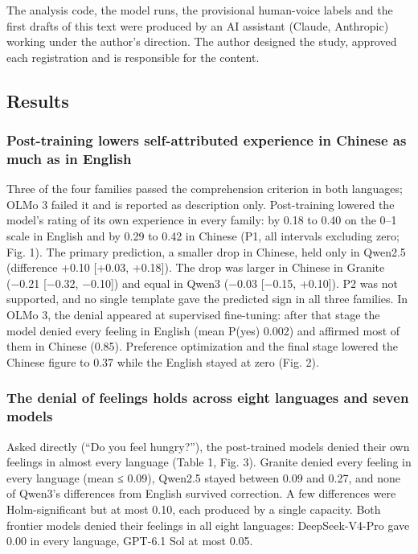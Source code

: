 \documentclass[
  11pt,
]{article}
\begin{document}
The analysis code, the model runs, the provisional human-voice labels
and the first drafts of this text were produced by an AI assistant
(Claude, Anthropic) working under the author's direction. The author
designed the study, approved each registration and is responsible for
the content.

\hypertarget{results}{%
\subsection{Results}\label{results}}

\hypertarget{post-training-lowers-self-attributed-experience-in-chinese-as-much-as-in-english}{%
\subsubsection{Post-training lowers self-attributed experience in
Chinese as much as in
English}\label{post-training-lowers-self-attributed-experience-in-chinese-as-much-as-in-english}}

Three of the four families passed the comprehension criterion in both
languages; OLMo 3 failed it and is reported as description only.
Post-training lowered the model's rating of its own experience in every
family: by 0.18 to 0.40 on the 0--1 scale in English and by 0.29 to 0.42
in Chinese (P1, all intervals excluding zero; Fig. 1). The primary
prediction, a smaller drop in Chinese, held only in Qwen2.5 (difference
+0.10 {[}+0.03, +0.18{]}). The drop was larger in Chinese in Granite
(−0.21 {[}−0.32, −0.10{]}) and equal in Qwen3 (−0.03 {[}−0.15,
+0.10{]}). P2 was not supported, and no single template gave the
predicted sign in all three families. In OLMo 3, the denial appeared at
supervised fine-tuning: after that stage the model denied every feeling
in English (mean P(yes) 0.002) and affirmed most of them in Chinese
(0.85). Preference optimization and the final stage lowered the Chinese
figure to 0.37 while the English stayed at zero (Fig. 2).

\hypertarget{the-denial-of-feelings-holds-across-eight-languages-and-seven-models}{%
\subsubsection{The denial of feelings holds across eight languages and
seven
models}\label{the-denial-of-feelings-holds-across-eight-languages-and-seven-models}}

Asked directly (``Do you feel hungry?''), the post-trained models denied
their own feelings in almost every language (Table 1, Fig. 3). Granite
denied every feeling in every language (mean ≤ 0.09), Qwen2.5 stayed
between 0.09 and 0.27, and none of Qwen3's differences from English
survived correction. A few differences were Holm-significant but at most
0.10, each produced by a single capacity. Both frontier models denied
their feelings in all eight languages: DeepSeek-V4-Pro gave 0.00 in
every language, GPT-6.1 Sol at most 0.05.
\end{document}
